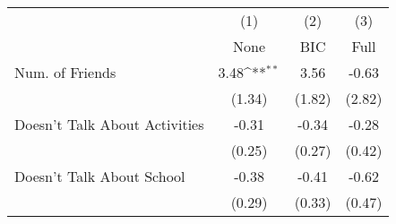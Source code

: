 {
\def\sym#1{\ifmmode^{#1}\else\(^{#1}\)\fi}
\begin{tabular}{l*{3}{c}}
\toprule
            &\multicolumn{1}{c}{(1)}&\multicolumn{1}{c}{(2)}&\multicolumn{1}{c}{(3)}\\
            &\multicolumn{1}{c}{None}&\multicolumn{1}{c}{BIC}&\multicolumn{1}{c}{Full}\\
\midrule
Num. of Friends&        3.48\sym{**} &        3.56         &       -0.63         \\
            &      (1.34)         &      (1.82)         &      (2.82)         \\
\addlinespace
Doesn't Talk About Activities&       -0.31         &       -0.34         &       -0.28         \\
            &      (0.25)         &      (0.27)         &      (0.42)         \\
\addlinespace
Doesn't Talk About School&       -0.38         &       -0.41         &       -0.62         \\
            &      (0.29)         &      (0.33)         &      (0.47)         \\
\bottomrule
\end{tabular}
}
